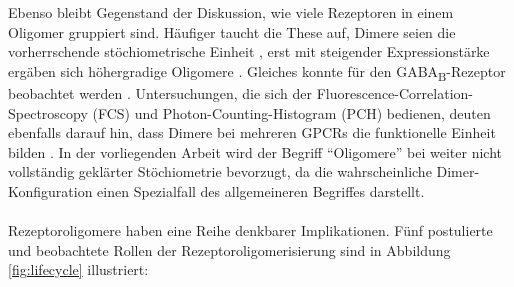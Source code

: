Ebenso bleibt Gegenstand der Diskussion, wie viele Rezeptoren in einem Oligomer gruppiert sind. Häufiger taucht die These auf, Dimere seien die vorherrschende stöchiometrische Einheit \parencite{Dorsch2009}, erst mit steigender Expressionstärke ergäben sich höhergradige Oligomere \parencite{Calebiro2013}. Gleiches konnte für den GABA\textsubscript{B}-Rezeptor beobachtet werden \parencite{Maurel2008, Comps-agrar2011}. Untersuchungen, die sich der Fluorescence-Correlation-Spectroscopy (FCS) und Photon-Counting-Histogram (PCH) bedienen, deuten ebenfalls darauf hin, dass Dimere bei mehreren GPCRs die funktionelle Einheit bilden \parencite{Herrick-Davis2013}. In der vorliegenden Arbeit wird der Begriff "`Oligomere"' bei weiter nicht vollständig geklärter Stöchiometrie bevorzugt, da die wahrscheinliche Dimer-Konfiguration einen Spezialfall des allgemeineren Begriffes darstellt.
\\ \\
Rezeptoroligomere haben eine Reihe denkbarer Implikationen. Fünf postulierte und beobachtete Rollen der Rezeptoroligomerisierung sind in Abbildung \ref{fig:lifecycle} illustriert:

